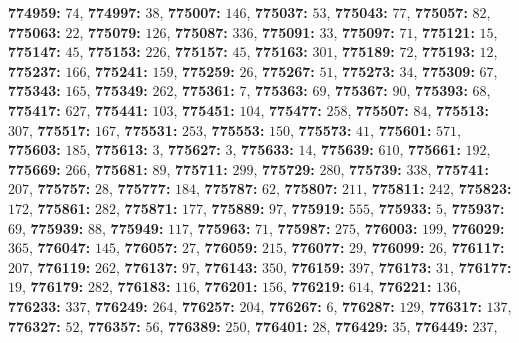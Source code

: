 \textsf{\bfseries 774959:} $74$, \textsf{\bfseries 774997:} $38$, \textsf{\bfseries 775007:} $146$, \textsf{\bfseries 775037:} $53$, \textsf{\bfseries 775043:} $77$, \textsf{\bfseries 775057:} $82$, \textsf{\bfseries 775063:} $22$, \textsf{\bfseries 775079:} $126$, \textsf{\bfseries 775087:} $336$, \textsf{\bfseries 775091:} $33$, \textsf{\bfseries 775097:} $71$, \textsf{\bfseries 775121:} $15$, \textsf{\bfseries 775147:} $45$, \textsf{\bfseries 775153:} $226$, \textsf{\bfseries 775157:} $45$, \textsf{\bfseries 775163:} $301$, \textsf{\bfseries 775189:} $72$, \textsf{\bfseries 775193:} $12$, \textsf{\bfseries 775237:} $166$, \textsf{\bfseries 775241:} $159$, \textsf{\bfseries 775259:} $26$, \textsf{\bfseries 775267:} $51$, \textsf{\bfseries 775273:} $34$, \textsf{\bfseries 775309:} $67$, \textsf{\bfseries 775343:} $165$, \textsf{\bfseries 775349:} $262$, \textsf{\bfseries 775361:} $7$, \textsf{\bfseries 775363:} $69$, \textsf{\bfseries 775367:} $90$, \textsf{\bfseries 775393:} $68$, \textsf{\bfseries 775417:} $627$, \textsf{\bfseries 775441:} $103$, \textsf{\bfseries 775451:} $104$, \textsf{\bfseries 775477:} $258$, \textsf{\bfseries 775507:} $84$, \textsf{\bfseries 775513:} $307$, \textsf{\bfseries 775517:} $167$, \textsf{\bfseries 775531:} $253$, \textsf{\bfseries 775553:} $150$, \textsf{\bfseries 775573:} $41$, \textsf{\bfseries 775601:} $571$, \textsf{\bfseries 775603:} $185$, \textsf{\bfseries 775613:} $3$, \textsf{\bfseries 775627:} $3$, \textsf{\bfseries 775633:} $14$, \textsf{\bfseries 775639:} $610$, \textsf{\bfseries 775661:} $192$, \textsf{\bfseries 775669:} $266$, \textsf{\bfseries 775681:} $89$, \textsf{\bfseries 775711:} $299$, \textsf{\bfseries 775729:} $280$, \textsf{\bfseries 775739:} $338$, \textsf{\bfseries 775741:} $207$, \textsf{\bfseries 775757:} $28$, \textsf{\bfseries 775777:} $184$, \textsf{\bfseries 775787:} $62$, \textsf{\bfseries 775807:} $211$, \textsf{\bfseries 775811:} $242$, \textsf{\bfseries 775823:} $172$, \textsf{\bfseries 775861:} $282$, \textsf{\bfseries 775871:} $177$, \textsf{\bfseries 775889:} $97$, \textsf{\bfseries 775919:} $555$, \textsf{\bfseries 775933:} $5$, \textsf{\bfseries 775937:} $69$, \textsf{\bfseries 775939:} $88$, \textsf{\bfseries 775949:} $117$, \textsf{\bfseries 775963:} $71$, \textsf{\bfseries 775987:} $275$, \textsf{\bfseries 776003:} $199$, \textsf{\bfseries 776029:} $365$, \textsf{\bfseries 776047:} $145$, \textsf{\bfseries 776057:} $27$, \textsf{\bfseries 776059:} $215$, \textsf{\bfseries 776077:} $29$, \textsf{\bfseries 776099:} $26$, \textsf{\bfseries 776117:} $207$, \textsf{\bfseries 776119:} $262$, \textsf{\bfseries 776137:} $97$, \textsf{\bfseries 776143:} $350$, \textsf{\bfseries 776159:} $397$, \textsf{\bfseries 776173:} $31$, \textsf{\bfseries 776177:} $19$, \textsf{\bfseries 776179:} $282$, \textsf{\bfseries 776183:} $116$, \textsf{\bfseries 776201:} $156$, \textsf{\bfseries 776219:} $614$, \textsf{\bfseries 776221:} $136$, \textsf{\bfseries 776233:} $337$, \textsf{\bfseries 776249:} $264$, \textsf{\bfseries 776257:} $204$, \textsf{\bfseries 776267:} $6$, \textsf{\bfseries 776287:} $129$, \textsf{\bfseries 776317:} $137$, \textsf{\bfseries 776327:} $52$, \textsf{\bfseries 776357:} $56$, \textsf{\bfseries 776389:} $250$, \textsf{\bfseries 776401:} $28$, \textsf{\bfseries 776429:} $35$, \textsf{\bfseries 776449:} $237$, 
